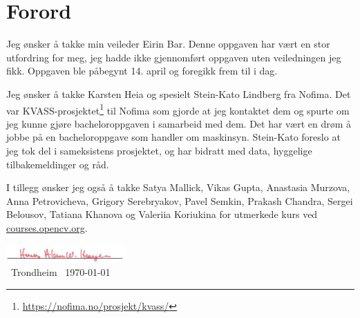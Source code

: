 \section*{Forord}

Jeg ønsker å takke min veileder Eirin Bar. Denne oppgaven har vært en stor utfordring for meg, jeg hadde ikke gjennomført oppgaven uten veiledningen jeg fikk. Oppgaven ble påbegynt 14. april og foregikk frem til i dag.

Jeg ønsker å takke Karsten Heia og spesielt Stein-Kato Lindberg fra Nofima. Det var KVASS-prosjektet\footnote{\url{https://nofima.no/prosjekt/kvass/}} til Nofima som gjorde at jeg kontaktet dem og spurte om jeg kunne gjøre bacheloroppgaven i samarbeid med dem. Det har vært en drøm å jobbe på en bacheloroppgave som handler om maskinsyn. Stein-Kato foreslo at jeg tok del i sameksistens prosjektet, og har bidratt med data, hyggelige tilbakemeldinger og råd.

I tillegg ønsker jeg også å takke Satya Mallick, Vikas Gupta, Anastasia Murzova, Anna Petrovicheva, Grigory Serebryakov, Pavel Semkin, Prakash Chandra, Sergei Belousov, Tatiana Khanova og Valeriia Koriukina for utmerkede kurs ved \url{courses.opencv.org}.

\begin{flushright} 
\includegraphics{figures/underskrift}\\ \ Trondheim \ \today
\end{flushright} 


